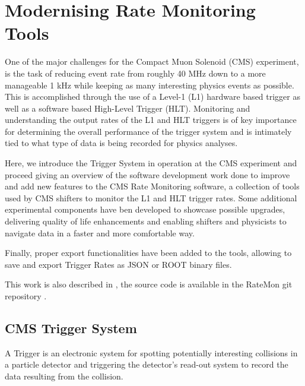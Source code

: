 \chapter{Modernising Rate Monitoring Tools}
\label{ratemon}

One of the major challenges for the Compact Muon Solenoid (CMS) experiment, is the task of reducing event rate from roughly 40 MHz down to a more manageable 1 kHz while keeping as many interesting physics events as possible. This is accomplished through the use of a Level-1 (L1) hardware based trigger as well as a software based High-Level Trigger (HLT). Monitoring and understanding the output rates of the L1 and HLT triggers is of key importance for determining the overall performance of the trigger system and is intimately tied to what type of data is being recorded for physics analyses.

Here, we introduce the Trigger System in operation at the CMS experiment and proceed giving an overview of the software development work done to improve and add new features to the CMS Rate Monitoring software, a collection of tools used by CMS shifters to monitor the L1 and HLT trigger rates. Some additional experimental components have ben developed to showcase possible upgrades, delivering quality of life enhancements and enabling shifters and physicists to navigate data in a faster and more comfortable way.

Finally, proper export functionalities have been added to the tools, allowing to save and export Trigger Rates as JSON or ROOT binary files.

This work is also described in \cite{VivaceRTM1} \cite{VivaceRTM2} \cite{L1TriggerOMSDevelopments} \cite{MohrmanRTM}, the source code is available in the RateMon git repository \cite{RateMonGit}.

\section{CMS Trigger System}

A Trigger is an  electronic system for spotting potentially interesting collisions in a particle detector and triggering the detector’s read-out system to record the data resulting from the collision.


